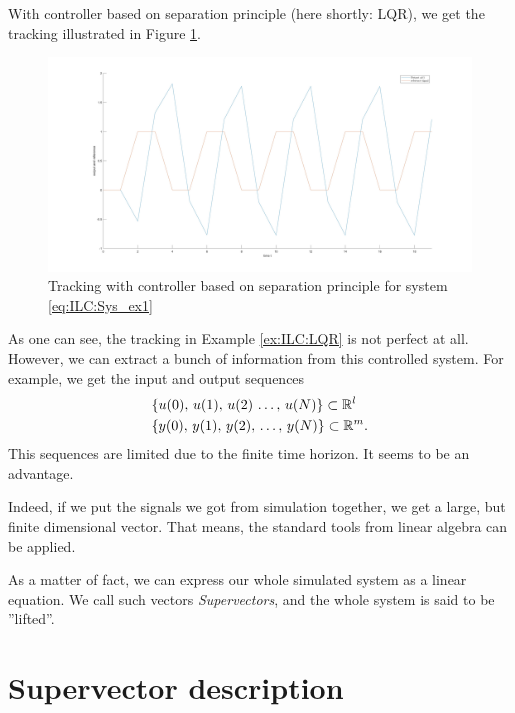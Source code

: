\begin{exam}
With controller based on separation principle (here shortly: LQR), we get the tracking illustrated in  Figure \ref{img:ILC:LQR_control}.
\begin{figure}[ht]
	\centering
	\includegraphics[width=\textwidth]{fig/LQR_ex.jpg}
	\caption{Tracking with controller based on separation principle for system \eqref{eq:ILC:Sys_ex1}}
	\label{img:ILC:LQR_control}
\end{figure}
\end{exam}



As one can see, the tracking in Example \ref{ex:ILC:LQR} is not perfect at all. However, we can extract a bunch of information from this controlled system. For example, we get the input and output sequences 
\begin{align}
&\{u(0), \, u(1), \,  u(2) \, \dots , \, u(N)\} \subset {\mathbb{R}}^l \label{eq:ILC:u_seq} \\
&\{y(0), \, y(1), \, y(2) , \, \dots , \, y(N)\}\subset {\mathbb{R}}^m.\label{eq:ILC:y_seq}
\end{align}
This sequences are limited due to the finite time horizon. It seems to be an advantage. 

Indeed, if we put the signals we got from simulation together, we get a large, but finite dimensional vector. That means, the standard tools from linear algebra can be applied. 

As a matter of fact, we can express our whole simulated system as a linear equation. We call such vectors \textit{Supervectors}, and the whole system is said to be ''lifted''.

\section{Supervector description} 

